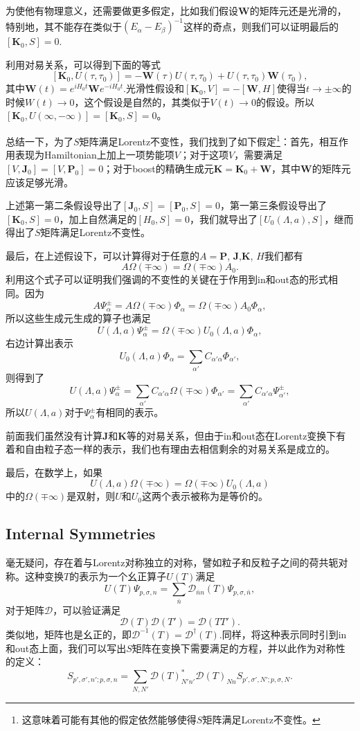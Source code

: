 \documentclass[9pt]{extbook}
\begin{document}
为使他有物理意义，还需要做更多假定，比如我们假设$\bm{W}$的矩阵元还是光滑的，特别地，其不能存在类似于$(E_\alpha-E_\beta)^{-1}$这样的奇点，则我们可以证明最后的$[\bm{K}_0,S]=0$.

利用对易关系，可以得到下面的等式
\[
[\bm{K}_0,U(\tau,\tau_0)]=-\bm{W}(\tau)U(\tau,\tau_0)+U(\tau,\tau_0)\bm{W}(\tau_0),
\]
其中$\bm{W}(t)=e^{iH_0t}\bm{W}e^{-iH_0t}$.光滑性假设和$[\bm{K}_0,V]=-[\bm{W},H]$使得当$t\to \pm \infty$的时候$W(t)\to 0$，这个假设是自然的，其类似于$V(t)\to 0$的假设。所以$[\bm{K}_0,U(\infty,-\infty)]=[\bm{K}_0,S]=0$。

总结一下，为了$S$矩阵满足Lorentz不变性，我们找到了如下假定\footnote{这意味着可能有其他的假定依然能够使得$S$矩阵满足Lorentz不变性。}：首先，相互作用表现为Hamiltonian上加上一项势能项$V$；对于这项$V$，需要满足$[V,\bm{J}_0]=[V,\bm{P}_0]=0$；对于boost的精确生成元$\bm{K}=\bm{K}_0+\bm{W}$，其中$\bm{W}$的矩阵元应该足够光滑。

上述第一第二条假设导出了$[\bm{J}_0,S]=[\bm{P}_0,S]=0$，第一第三条假设导出了$[\bm{K}_0,S]=0$，加上自然满足的$[H_0,S]=0$，我们就导出了$[U_0(\Lambda,a),S]$，继而得出了$S$矩阵满足Lorentz不变性。

最后，在上述假设下，可以计算得对于任意的$A=\bm{P}$, $\bm{J}$,$ \bm{K}$, $H$我们都有
\[
A\Omega(\mp \infty)=\Omega(\mp \infty)A_0.
\]
利用这个式子可以证明我们强调的不变性的关键在于作用到in和out态的形式相同。因为
\[
A\Psi_\alpha^\pm=A\Omega(\mp \infty)\Phi_\alpha=\Omega(\mp \infty)A_0\Phi_\alpha,
\]
所以这些生成元生成的算子也满足
\[
U(\Lambda,a)\Psi_\alpha^\pm=\Omega(\mp \infty)U_0(\Lambda,a)\Phi_\alpha,
\]
右边计算出表示
\[
U_0(\Lambda,a)\Phi_\alpha=\sum_{\alpha'}C_{\alpha'\alpha}\Phi_{\alpha'},
\]
则得到了
\[
U(\Lambda,a)\Psi_\alpha^\pm=\sum_{\alpha'}C_{\alpha'\alpha}\Omega(\mp \infty)\Phi_{\alpha'}=\sum_{\alpha'}C_{\alpha'\alpha}\Psi^\pm_{\alpha'},
\]
所以$U(\Lambda,a)$对于$\Psi_\alpha^\pm$有相同的表示。

前面我们虽然没有计算$\bm{J}$和$\bm{K}$等的对易关系，但由于in和out态在Lorentz变换下有着和自由粒子态一样的表示，我们也有理由去相信剩余的对易关系是成立的。

最后，在数学上，如果
\[
	U(\Lambda,a)\Omega(\mp \infty)=\Omega(\mp \infty)U_0(\Lambda,a)
\]
中的$\Omega(\mp \infty)$是双射，则$U$和$U_0$这两个表示被称为是等价的。

\subsection*{Internal Symmetries}

毫无疑问，存在着与Lorentz对称独立的对称，譬如粒子和反粒子之间的荷共轭对称。这种变换$T$的表示为一个幺正算子$U(T)$满足
\[
U(T)\Psi_{p,\sigma,n}=\sum_{\bar{n}} \mathcal{D}_{\bar{n}n}(T)\Psi_{ p,\sigma,\bar{n}},
\]
对于矩阵$\mathcal{D}$，可以验证满足
\[
	\mathcal{D}(T)\mathcal{D}(T')=\mathcal{D}(TT').
\]
类似地，矩阵也是幺正的，即$\mathcal{D}^{-1}(T)=\mathcal{D}^\dag(T)$.同样，将这种表示同时引到in和out态上面，我们可以写出$S$矩阵在变换下需要满足的方程，并以此作为对称性的定义：
\[
	S_{p',\sigma',n';p,\sigma,n}=\sum_{N,N'}\mathcal{D}(T)^*_{N'n'}\mathcal{D}(T)_{Nn}S_{p',\sigma',N';p,\sigma,N}.
\]
\end{document}
